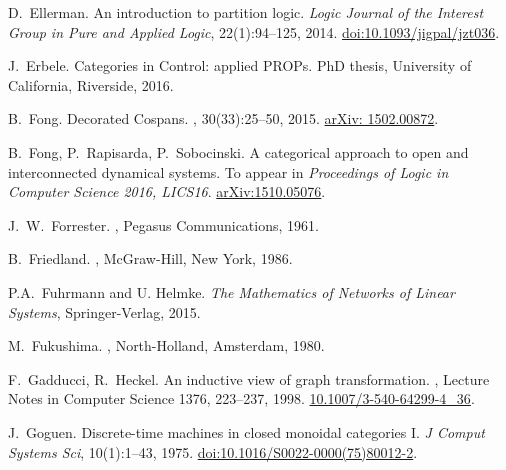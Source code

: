 \begin{thebibliography}{RSW00}
  D.\ Ellerman.
  \newblock An introduction to partition logic.
  \newblock \textsl{Logic Journal of the Interest Group in Pure and Applied
  Logic}, { 22}(1):94--125, 2014.
  \newblock
  \href{http://doi.org/10.1093/jigpal/jzt036}{doi:10.1093/jigpal/jzt036}.
    
    J.\ Erbele.
    \newblock Categories in Control: applied PROPs.
    \newblock PhD thesis, University of California, Riverside, 2016. 

    B.\ Fong.
    \newblock Decorated Cospans.
    , 30(33):25--50, 2015.
    \newblock \href{http://arxiv.org/abs/1502.00872}{arXiv: 1502.00872}.

    B.\ Fong, P.\ Rapisarda, P.\ Sobocinski.
    \newblock A categorical approach to open and interconnected dynamical
    systems.
    \newblock To appear in {\sl Proceedings of Logic in Computer Science 2016,
    LICS16}.
    \newblock \href{http://arxiv.org/abs/1510.05076}{arXiv:1510.05076}.

    J.\ W.\ Forrester.
    , Pegasus Communications, 1961. 

    B.\ Friedland. 
    , McGraw-Hill, New York, 1986.

    P.A.~Fuhrmann and U. Helmke.
    \newblock \emph{The Mathematics of Networks of Linear Systems},
    Springer-Verlag, 2015. 

    M.\ Fukushima.
    ,
    North-Holland, Amsterdam, 1980.

    F.\ Gadducci, R.\ Heckel.
    \newblock An inductive view of graph transformation.
    , Lecture
    Notes in Computer Science 1376, 223--237, 1998.
    \newblock \href{http://doi.org/10.1007/3-540-64299-4_36}{
    10.1007/3-540-64299-4\_36}.

    J.\ Goguen.
    \newblock Discrete-time machines in closed monoidal categories I.
    \newblock \emph{J Comput Systems Sci}, 10(1):1--43, 1975.
    \newblock
    \href{http://doi.org/10.1016/S0022-0000(75)80012-2}{doi:10.1016/S0022-0000(75)80012-2}.


\end{thebibliography}
